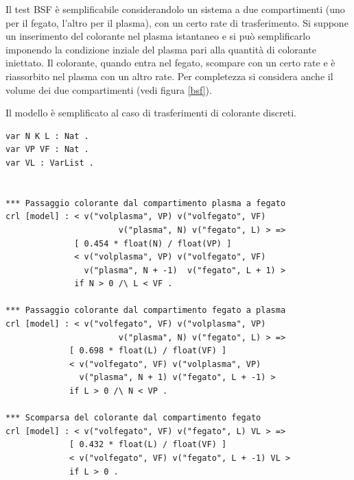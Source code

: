 Il test BSF \cite{gnudi} è semplificabile considerandolo un sistema a due compartimenti
(uno per il fegato, l'altro per il plasma), con un certo rate di trasferimento. Si
suppone un inserimento del colorante nel plasma istantaneo e si può
semplificarlo imponendo la condizione inziale del plasma pari alla quantità di
colorante iniettato. Il colorante, quando entra nel fegato, scompare con un
certo rate e è riassorbito nel plasma con un altro rate. Per completezza si
considera anche il volume dei due compartimenti (vedi figura \ref{bsf}).

Il modello è semplificato al caso di trasferimenti di colorante discreti.

\begin{Verbatim}[fontsize=\small]
var N K L : Nat .
var VP VF : Nat .
var VL : VarList .
	
	
*** Passaggio colorante dal compartimento plasma a fegato
crl [model] : < v("volplasma", VP) v("volfegato", VF)
                       v("plasma", N) v("fegato", L) > =>
              [ 0.454 * float(N) / float(VP) ]
              < v("volplasma", VP) v("volfegato", VF)
                v("plasma", N + -1)  v("fegato", L + 1) >
              if N > 0 /\ L < VF .

*** Passaggio colorante dal compartimento fegato a plasma            
crl [model] : < v("volfegato", VF) v("volplasma", VP)
                       v("plasma", N) v("fegato", L) > =>
             [ 0.698 * float(L) / float(VF) ]
             < v("volfegato", VF) v("volplasma", VP)
               v("plasma", N + 1) v("fegato", L + -1) >
             if L > 0 /\ N < VP .
		
*** Scomparsa del colorante dal compartimento fegato
crl [model] : < v("volfegato", VF) v("fegato", L) VL > =>
             [ 0.432 * float(L) / float(VF) ]
             < v("volfegato", VF) v("fegato", L + -1) VL >
             if L > 0 .
	
\end{Verbatim}